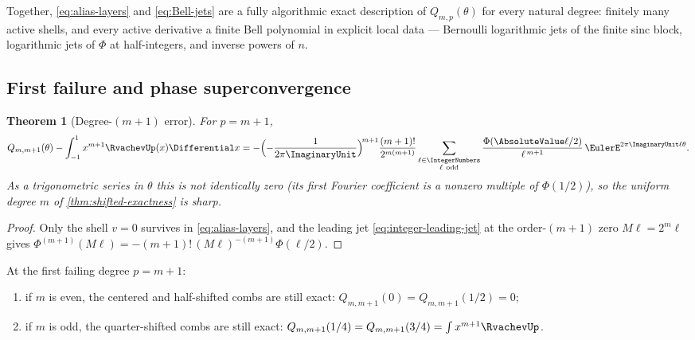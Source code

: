 \documentclass[11pt,oneside]{article}
\numberwithin{equation}{section}
\newtheorem{theorem}{Theorem}[section]
\theoremstyle{definition}
\theoremstyle{remark}
\begin{document}
Together, \eqref{eq:alias-layers} and \eqref{eq:Bell-jets} are a fully
algorithmic exact description of $Q_{m,p}(\theta)$ for every natural
degree: finitely many active shells, and every active derivative a
finite Bell polynomial in explicit local data ---
Bernoulli logarithmic jets of the finite sinc block, logarithmic jets
of $\Phi$ at half-integers, and inverse powers of $n$.

\subsection{First failure and phase superconvergence}

\begin{theorem}[Degree-$(m{+}1)$ error]
\label{thm:first-failure}
For $p=m+1$,
\begin{equation}
 Q_{m,m+1}(\theta)-\int_{-1}^{1}x^{m+1}\RvachevUp(x)\Differential x
 =-\Bigl(-\frac{1}{2\pi\ImaginaryUnit}\Bigr)^{\!m+1}
 \frac{(m+1)!}{2^{m(m+1)}}
 \sum_{\substack{\ell\in\IntegerNumbers\\ \ell\ \mathrm{odd}}}
 \frac{\Phi(\AbsoluteValue\ell/2)}{\ell^{\,m+1}}\,
 \EulerE^{2\pi\ImaginaryUnit\ell\theta}.
 \label{eq:first-failure}
\end{equation}
As a trigonometric series in $\theta$ this is not identically zero
(its first Fourier coefficient is a nonzero multiple of
$\Phi(1/2)$), so the uniform degree $m$ of
\cref{thm:shifted-exactness} is sharp.
\end{theorem}

\begin{proof}
Only the shell $v=0$ survives in \eqref{eq:alias-layers}, and the
leading jet \eqref{eq:integer-leading-jet} at the order-$(m{+}1)$ zero
$M\ell=2^{m}\ell$ gives
$\Phi^{(m+1)}(M\ell)=-(m+1)!\,(M\ell)^{-(m+1)}\Phi(\ell/2)$.
\end{proof}

\begin{corollary}
\label{cor:phase-super}
At the first failing degree $p=m+1$:
\begin{enumerate}
\item if $m$ is even, the centered and half-shifted combs are still
exact: $Q_{m,m+1}(0)=Q_{m,m+1}(1/2)=0$;
\item if $m$ is odd, the quarter-shifted combs are still exact:
$Q_{m,m+1}(1/4)=Q_{m,m+1}(3/4)
=\int x^{m+1}\RvachevUp$.
\end{enumerate}
\end{corollary}
\end{document}
